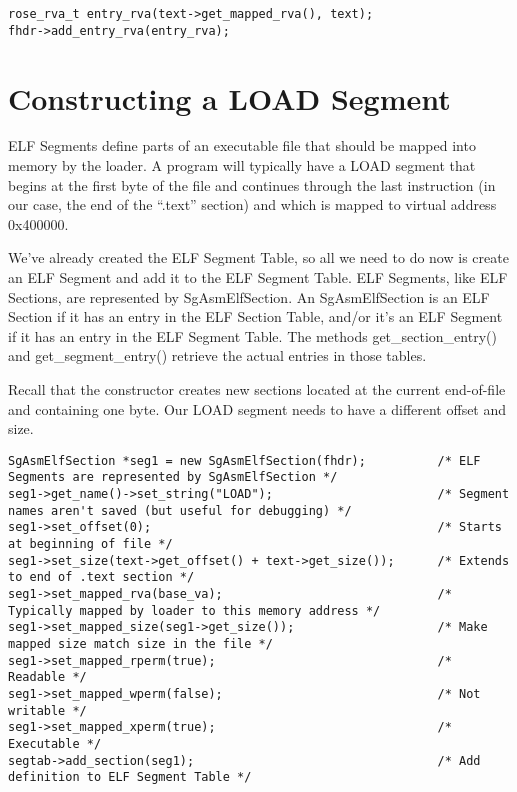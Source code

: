 \begin{verbatim}
rose_rva_t entry_rva(text->get_mapped_rva(), text);
fhdr->add_entry_rva(entry_rva);
\end{verbatim}

\section{Constructing a LOAD Segment}

ELF Segments define parts of an executable file that should be mapped
into memory by the loader.  A program will typically have a LOAD
segment that begins at the first byte of the file and continues
through the last instruction (in our case, the end of the ``.text''
section) and which is mapped to virtual address 0x400000.

We've already created the ELF Segment Table, so all we need to do now
is create an ELF Segment and add it to the ELF Segment Table. ELF
Segments, like ELF Sections, are represented by SgAsmElfSection. An
SgAsmElfSection is an ELF Section if it has an entry in the ELF
Section Table, and/or it's an ELF Segment if it has an entry in the
ELF Segment Table. The methods get\_section\_entry() and
get\_segment\_entry() retrieve the actual entries in those tables.

Recall that the constructor creates new sections located at the
current end-of-file and containing one byte. Our LOAD segment needs to
have a different offset and size.

\begin{verbatim}
SgAsmElfSection *seg1 = new SgAsmElfSection(fhdr);          /* ELF Segments are represented by SgAsmElfSection */
seg1->get_name()->set_string("LOAD");                       /* Segment names aren't saved (but useful for debugging) */
seg1->set_offset(0);                                        /* Starts at beginning of file */
seg1->set_size(text->get_offset() + text->get_size());      /* Extends to end of .text section */
seg1->set_mapped_rva(base_va);                              /* Typically mapped by loader to this memory address */
seg1->set_mapped_size(seg1->get_size());                    /* Make mapped size match size in the file */
seg1->set_mapped_rperm(true);                               /* Readable */
seg1->set_mapped_wperm(false);                              /* Not writable */
seg1->set_mapped_xperm(true);                               /* Executable */
segtab->add_section(seg1);                                  /* Add definition to ELF Segment Table */
\end{verbatim}

